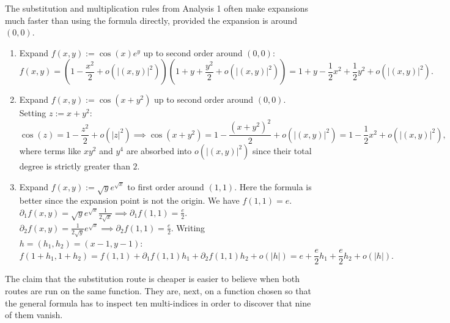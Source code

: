 \begin{example}
\label{ex:more_taylor_via_analysis1}
The substitution and multiplication rules from Analysis 1 often make expansions much faster than using the formula directly, provided the expansion is around $(0,0)$.
\begin{enumerate}[label=\textbf{(\alph*)}]
  \item Expand $f(x,y) := \cos(x)e^y$ up to second order around $(0,0)$:
  \[f(x,y) = \left(1 - \frac{x^2}{2} + o(|(x,y)|^2)\right)\left(1 + y + \frac{y^2}{2} + o(|(x,y)|^2)\right) = 1 + y - \frac{1}{2}x^2 + \frac{1}{2}y^2 + o(|(x,y)|^2).\]
  \item Expand $f(x,y) := \cos(x+y^2)$ up to second order around $(0,0)$. Setting $z := x+y^2$:
  \[\cos(z) = 1 - \frac{z^2}{2} + o(|z|^2) \implies \cos(x+y^2) = 1 - \frac{(x+y^2)^2}{2} + o(|(x,y)|^2) = 1 - \frac{1}{2}x^2 + o(|(x,y)|^2),\]
  where terms like $xy^2$ and $y^4$ are absorbed into $o(|(x,y)|^2)$ since their total degree is strictly greater than $2$.
  \item Expand $f(x,y) := \sqrt{y} e^{\sqrt{x}}$ to first order around $(1,1)$. Here the formula is better since the expansion point is not the origin.
  We have $f(1,1) = e$.
  $\partial_1 f(x,y) = \sqrt{y} e^{\sqrt{x}} \frac{1}{2\sqrt{x}} \implies \partial_1 f(1,1) = \frac{e}{2}$.
  $\partial_2 f(x,y) = \frac{1}{2\sqrt{y}} e^{\sqrt{x}} \implies \partial_2 f(1,1) = \frac{e}{2}$.
  Writing $h = (h_1,h_2) = (x-1, y-1)$:
  \[f(1+h_1, 1+h_2) = f(1,1) + \partial_1 f(1,1)h_1 + \partial_2 f(1,1)h_2 + o(|h|) = e + \frac{e}{2}h_1 + \frac{e}{2}h_2 + o(|h|).\]
\end{enumerate}
\end{example}

The claim that the substitution route is cheaper is easier to believe when both routes are run on
the same function. They are, next, on a function chosen so that the general formula has to inspect
ten multi-indices in order to discover that nine of them vanish.


